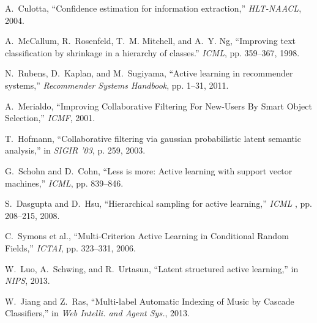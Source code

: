 \documentclass[10pt, conference, compsocconf]{IEEEtran}
\begin{document}
\begin{small}
\begin{thebibliography}{10}
A.~Culotta, ``{Confidence estimation for information extraction},''
  \emph{HLT-NAACL}, 2004. %

A.~McCallum, R.~Rosenfeld, T.~M. Mitchell, and A.~Y. Ng, ``Improving text
  classification by shrinkage in a hierarchy of classes.'' \emph{ICML},
  pp. 359--367, 1998.

N.~Rubens, D.~Kaplan, and M.~Sugiyama, ``{Active learning in recommender
  systems},'' \emph{Recommender Systems Handbook}, pp. 1--31, 2011. %

A.~Merialdo, ``{Improving Collaborative Filtering For New-Users By Smart Object
  Selection},'' \emph{ICMF}, 2001. %

T.~Hofmann, ``{Collaborative filtering via gaussian probabilistic latent
  semantic analysis},'' in \emph{ SIGIR '03}, p. 259, 2003.

G.~Schohn and D.~Cohn, ``{Less is more: Active learning with support vector
  machines},'' \emph{ICML}, pp. 839--846. %

S.~Dasgupta and D.~Hsu, ``{Hierarchical sampling for active learning},''
  \emph{ICML }, pp. 208--215, 2008. %

C.~Symons et al.,
  ``{Multi-Criterion Active Learning in Conditional
  Random Fields},'' \emph{ ICTAI}, pp. 323--331, 2006. %

W.~Luo, A.~Schwing, and R.~Urtasun, ``Latent structured active learning,'' in
  \emph{NIPS}, 2013.
  
W.~Jiang and Z.~Ras, ``Multi-label Automatic Indexing of Music by Cascade Classifiers,'' in \emph{Web Intelli. and Agent Sys.}, 2013.

\end{thebibliography}
\end{small}

\end{document}
